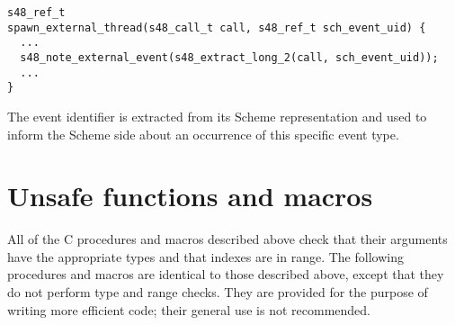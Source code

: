 \begin{verbatim}
s48_ref_t
spawn_external_thread(s48_call_t call, s48_ref_t sch_event_uid) {
  ...
  s48_note_external_event(s48_extract_long_2(call, sch_event_uid));
  ...
}
\end{verbatim}

\noindent{}The event identifier is extracted from its Scheme
representation and used to inform the Scheme side about an occurrence
of this specific event type.

\section{Unsafe functions and macros}

All of the C procedures and macros described above check that their
 arguments have the appropriate types and that indexes are in range.
The following procedures and macros are identical to those described
 above, except that they do not perform type and range checks.
They are provided for the purpose of writing more efficient code;
 their general use is not recommended.


